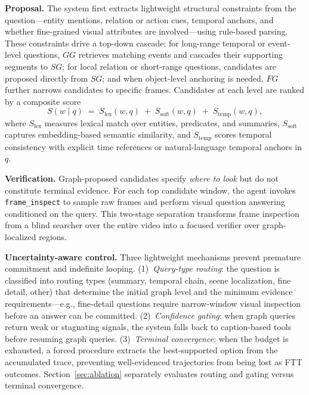 \documentclass[sigconf, screen, review, anonymous]{acmart}
\begin{document}
\textbf{Proposal.}\quad
The system first extracts lightweight structural constraints from the
question---entity mentions, relation or action cues, temporal anchors, and
whether fine-grained visual attributes are involved---using rule-based
parsing.  These constraints drive a top-down cascade: for long-range
temporal or event-level questions, $GG$ retrieves matching events and
cascades their supporting segments to $SG$; for local relation or
short-range questions, candidates are proposed directly from $SG$; and when
object-level anchoring is needed, $FG$ further narrows candidates to
specific frames.  Candidates at each level are ranked by a composite score
\begin{equation}
  S(w \mid q) \;=\; S_{\text{lex}}(w,q) \;+\;
  S_{\text{soft}}(w,q) \;+\; S_{\text{temp}}(w,q),
\end{equation}
where $S_{\text{lex}}$ measures lexical match over entities, predicates,
and summaries, $S_{\text{soft}}$ captures embedding-based semantic
similarity, and $S_{\text{temp}}$ scores temporal consistency with
explicit time references or natural-language temporal anchors in $q$.

\textbf{Verification.}\quad
Graph-proposed candidates specify \emph{where to look} but do not
constitute terminal evidence.  For each top candidate window, the agent
invokes \texttt{frame\_inspect} to sample raw frames and perform visual
question answering conditioned on the query.  This two-stage separation
transforms frame inspection from a blind searcher over the entire video
into a focused verifier over graph-localized regions.

\textbf{Uncertainty-aware control.}\quad
Three lightweight mechanisms prevent premature commitment and indefinite
looping.  (1)~\emph{Query-type routing}: the question is classified into
routing types (summary, temporal chain, scene localization, fine detail,
other) that determine the initial graph level and the minimum evidence
requirements---e.g., fine-detail questions require narrow-window visual
inspection before an answer can be committed.  (2)~\emph{Confidence
gating}: when graph queries return weak or stagnating signals, the system
falls back to caption-based tools before resuming graph queries.
(3)~\emph{Terminal convergence}: when the budget is exhausted, a forced
procedure extracts the best-supported option from the accumulated trace,
preventing well-evidenced trajectories from being lost as FTT outcomes.
Section~\ref{sec:ablation} separately evaluates routing and gating versus
terminal convergence.
\end{document}
